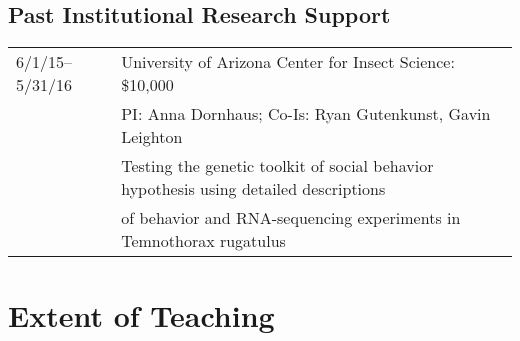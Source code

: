 \documentclass[11pt]{article}
\begin{document}
                  


\subsection*{Past Institutional Research Support}
\begin{longtable}[l]{l l}
6/1/15--5/31/16 & University of Arizona Center for Insect Science: \$10,000\\
& PI: Anna Dornhaus; Co-Is: Ryan Gutenkunst, Gavin Leighton\\
& Testing the genetic toolkit of social behavior hypothesis using detailed descriptions\\
&of behavior and RNA-sequencing experiments in Temnothorax rugatulus\\
\end{longtable}

\section*{Extent of Teaching}
\end{document}
